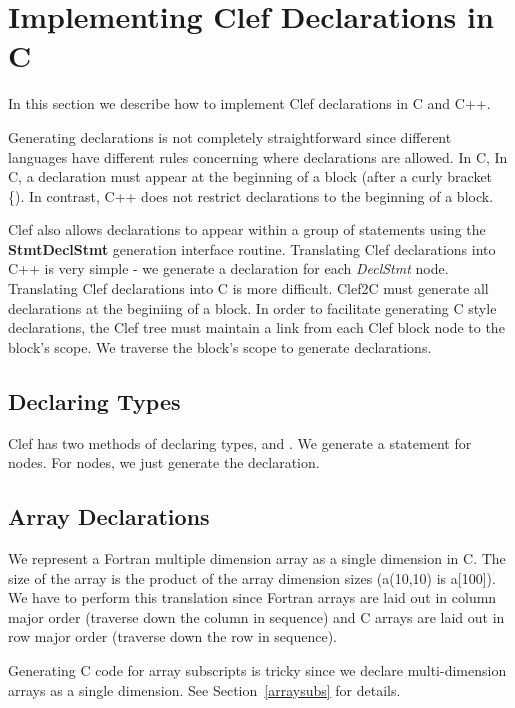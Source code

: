 
\section{Implementing Clef Declarations in C}
\label{sec:decls}

In this section we describe how to implement Clef declarations in C
and C++.

Generating declarations is not completely straightforward since
different languages have different rules concerning where declarations
are allowed.  In C, In C, a declaration must appear at the beginning
of a block (\ie after a curly bracket \{).  In contrast, C++ does not
restrict declarations to the beginning of a block.

Clef also allows declarations to appear within a group of statements
using the \textbf{StmtDeclStmt} generation interface routine.
Translating Clef declarations into C++ is very simple - we generate a
declaration for each \textit{DeclStmt} node.  Translating Clef
declarations into C is more difficult.  Clef2C must generate all
declarations at the beginiing of a block.  In order to facilitate
generating C style declarations, the Clef tree must maintain a link
from each Clef block node to the block's scope.  We traverse the
block's scope to generate declarations.

\subsection{Declaring Types}

Clef has two methods of declaring types,  and
.  We generate a  statement for 
 nodes.  For  nodes, we just
generate the declaration.


\subsection{Array Declarations}

We represent a Fortran multiple dimension array as a single dimension
in C.  The size of the array is the product of the array dimension
sizes (\eg a(10,10) is a[100]).  We have to perform this translation
since Fortran arrays are laid out in column major order (\ie traverse
down the column in sequence) and C arrays are laid out in row major
order (\ie traverse down the row in sequence).

Generating C code for array subscripts is tricky since we declare
multi-dimension arrays as a single dimension.  See
Section~\ref{arraysubs} for details.

